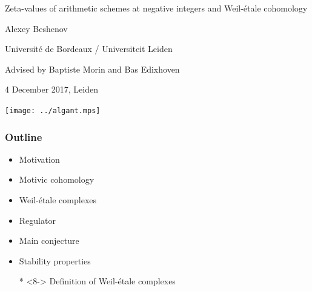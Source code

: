 \documentclass[handout]{beamer}
\begin{document}

\begin{frame}[noframenumbering]
  \headingfont
  \begin{center}
    {\huge Zeta-values of arithmetic schemes at negative integers and Weil-étale
      cohomology

    }

    \vspace{2em}

    {\large Alexey Beshenov}

    \vspace{0.20em}

    Universit\'e de Bordeaux / Universiteit Leiden

    \vspace{1em}

    {\large Advised by Baptiste Morin and Bas Edixhoven}

    \vspace{1em}

    {\tiny 4 December 2017, Leiden}

    \vspace{5em}

    \hspace{0.9cm}
    \hspace{0.9cm}
    \texttt{[image: ../algant.mps]}
  \end{center}
\end{frame}


\begin{frame}
  \frametitle{Outline}

  \begin{itemize}
  \item<2-> Motivation

  \item<3-> Motivic cohomology

  \item<4-> Weil-étale complexes

  \item<5-> Regulator

  \item<6-> Main conjecture

  \item<7-> Stability properties

  \item[*]<8-> Definition of Weil-étale complexes
  \end{itemize}

\end{frame}
\end{document}
